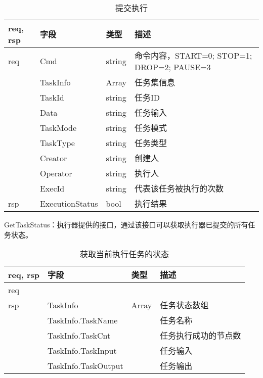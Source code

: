     \begin{table}[H]
        \centering
        \caption{提交执行}
        \label{tab:design-interface-submit-cmd}
        \begin{tabular}{llll}
            \toprule
            req, rsp   & 字段 & 类型 & 描述 \\
            \midrule
            req & Cmd & string & 命令内容，START=0; STOP=1; DROP=2; PAUSE=3\\
            & TaskInfo & Array & 任务集信息 \\
            & TaskId & string & 任务ID\\
            & Data & string & 任务输入\\
            & TaskMode & string & 任务模式\\
            & TaskType & string & 任务类型\\
            & Creator & string & 创建人\\
            & Operator & string & 执行人\\
            & ExecId & string & 代表该任务被执行的次数 \\ \hline
            rsp & ExecutionStatus & bool & 执行结果\\
            \bottomrule
        \end{tabular}
    \end{table}


    GetTaskStatus：执行器提供的接口，通过该接口可以获取执行器已提交的所有任务状态。

    \begin{table}[H]
        \centering
        \caption{获取当前执行任务的状态}
        \label{tab:design-interface-get-task-status}
        \begin{tabular}{llll}
            \toprule
            req, rsp   & 字段 & 类型 & 描述 \\
            \midrule
            req &  &  & \\ \hline
            rsp & TaskInfo & Array & 任务状态数组 \\
            & TaskInfo.TaskName & & 任务名称 \\
            & TaskInfo.TaskCnt & & 任务执行成功的节点数 \\
            & TaskInfo.TaskInput & & 任务输入 \\
            & TaskInfo.TaskOutput & & 任务输出 \\
            \bottomrule
        \end{tabular}
    \end{table}

